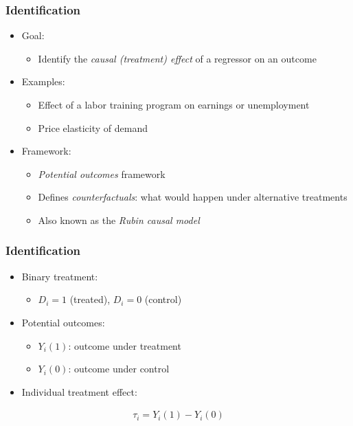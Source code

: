\documentclass[12pt, compress]{beamer}
\begin{document}
\begin{frame}
	\frametitle{Identification}

\begin{itemize}
	\item Goal:
	\begin{itemize}
		\item Identify the \textit{causal (treatment) effect} of a regressor on an outcome
	\end{itemize}
	
	\medskip
	
	\item Examples:
	\begin{itemize}
		\item Effect of a labor training program on earnings or unemployment
		\item Price elasticity of demand
	\end{itemize}
	
	\medskip
	
	\item Framework:
	\begin{itemize}
		\item \textit{Potential outcomes} framework \citep{rubin1974}
		\item Defines \textit{counterfactuals}: what would happen under alternative treatments
		\item Also known as the \textit{Rubin causal model} \citep{holland1986statistics}
	\end{itemize}

\end{itemize}

\end{frame}

\begin{frame}
	\frametitle{Identification}

\begin{itemize}
	\item Binary treatment:
	\begin{itemize}
		\item $D_i = 1$ (treated), $D_i = 0$ (control)
	\end{itemize}
	
	\medskip
	
	\item Potential outcomes:
	\begin{itemize}
		\item $Y_i(1)$: outcome under treatment
		\item $Y_i(0)$: outcome under control
	\end{itemize}
	
	\medskip
	
	\item Individual treatment effect:
\end{itemize}

\begin{align*}
	\tau_i = Y_i(1) - Y_i(0)
\end{align*}

\end{frame}
\end{document}

